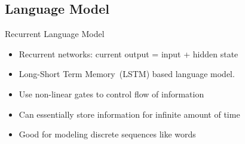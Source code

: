 \documentclass{beamer}
\begin{document}
\subsection{Language Model}
\begin{frame}{Recurrent Language Model}
\begin{itemize}
\item Recurrent networks: current output = input + hidden state
\item Long-Short Term Memory~(LSTM) based language model.
\item Use non-linear gates to control flow of information
\item Can essentially store information for infinite amount of time 
\item Good for modeling discrete sequences like words 
\end{itemize} 
\end{frame}
\end{document}
